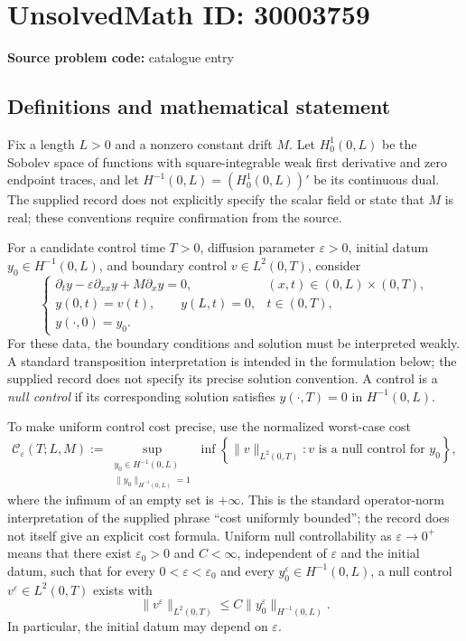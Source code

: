 \documentclass[11pt]{article}
\begin{document}
\section*{UnsolvedMath ID: 30003759}
\textbf{Source problem code:} catalogue entry
\subsection{Definitions and mathematical statement}
Fix a length \(L>0\) and a nonzero constant drift \(M\). Let \(H_0^1(0,L)\) be the Sobolev space of functions with square-integrable weak first derivative and zero endpoint traces, and let \(H^{-1}(0,L)=(H_0^1(0,L))'\) be its continuous dual. The supplied record does not explicitly specify the scalar field or state that \(M\) is real; these conventions require confirmation from the source.

For a candidate control time \(T>0\), diffusion parameter \(\varepsilon>0\), initial datum \(y_0\in H^{-1}(0,L)\), and boundary control \(v\in L^2(0,T)\), consider
\[
\begin{cases}
\partial_t y-\varepsilon\partial_{xx}y+M\partial_xy=0,
& (x,t)\in(0,L)\times(0,T),\\
y(0,t)=v(t),\qquad y(L,t)=0,
& t\in(0,T),\\
y(\cdot,0)=y_0.
\end{cases}
\]
For these data, the boundary conditions and solution must be interpreted weakly. A standard transposition interpretation is intended in the formulation below; the supplied record does not specify its precise solution convention. A control is a \emph{null control} if its corresponding solution satisfies \(y(\cdot,T)=0\) in \(H^{-1}(0,L)\).

To make uniform control cost precise, use the normalized worst-case cost
\[
\mathcal C_{\varepsilon}(T;L,M)
:=\sup_{\substack{y_0\in H^{-1}(0,L)\\ \|y_0\|_{H^{-1}(0,L)}=1}}
\inf\left\{\|v\|_{L^2(0,T)}:
 v\text{ is a null control for }y_0\right\},
\]
where the infimum of an empty set is \(+\infty\). This is the standard operator-norm interpretation of the supplied phrase ``cost uniformly bounded''; the record does not itself give an explicit cost formula. Uniform null controllability as \(\varepsilon\to0^+\) means that there exist \(\varepsilon_0>0\) and \(C<\infty\), independent of \(\varepsilon\) and the initial datum, such that for every \(0<\varepsilon<\varepsilon_0\) and every \(y_0^{\varepsilon}\in H^{-1}(0,L)\), a null control \(v^{\varepsilon}\in L^2(0,T)\) exists with
\[
\|v^{\varepsilon}\|_{L^2(0,T)}
\le C\|y_0^{\varepsilon}\|_{H^{-1}(0,L)}.
\]
In particular, the initial datum may depend on \(\varepsilon\).
\end{document}
